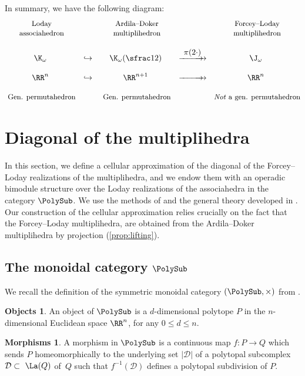 \documentclass[JEP,XML,SOM,NoFloatCountersInSection,Unicode,published]{cedram}
\def\hto{\mathrel{\lhook\joinrel\to}}
\newcommand{\onto}{\mathchoice{\to\hspace*{-5mm}\to}{\to\hspace*{-2.85mm}\to}{\to\hspace*{-3mm}\to}{\to\hspace*{-3mm}\to}}
\def\To#1{\mathchoice{\xrightarrow{\textstyle\kern4pt#1\kern3pt}}{\stackrel{#1}{\longrightarrow}}{}{}}
\def\Onto#1{\mathchoice{\To{#1}\hspace*{-5mm}\to}{\stackrel{#1}{\onto}}{}{}}
\let\dpl\displaystyle
\theoremstyle{definition}
\newtheorem*{objects}{Objects}
\newtheorem*{morphisms}{Morphisms}
\theoremstyle{plain}
\begin{document}
In summary, we have the following diagram:
\medskip
\begin{equation*}
\begin{matrix}
$ \small \text{Loday}$ & & $ \small \text{Ardila--Doker}$ & & $ \small \text{Forcey--Loday}$ \\
$ \small \text{associahedron}$ & & $ \small \text{multiplihedron}$ & & $ \small \text{multiplihedron}$ \\
& & & & \\
\K_\omega & \dpl\hto & \K_\omega (\sfrac12) & \dpl\Onto{\pi (2 \cdot)} & \J_\omega \\
& & & & \\
\RR^n & \dpl\hto & \RR^{n+1} & \dpl\Onto{\hphantom{\pi (2 \cdot)}} & \RR^n \\
& & & & \\
$ \small \text{Gen. permutahedron}$ & & $ \small \text{Gen. permutahedron}$ & & $ \small \textit{Not}\text{ a gen. permutahedron}$
\end{matrix}
\end{equation*}

\section{Diagonal of the multiplihedra}
\label{sec:II}

In this section, we define a cellular approximation of the diagonal of the Forcey--Loday realizations of the multiplihedra, and we endow them with an operadic bimodule structure over the Loday realizations of the associahedra in the category $\PolySub$.
We use the methods of \cite{MTTV19} and the general theory developed in \cite{LA21}.
Our construction of the cellular approximation relies crucially on the fact that the Forcey--Loday multiplihedra, are obtained from the Ardila--Doker multiplihedra by projection (\cref{prop:lifting}).

\subsection{The monoidal category $\PolySub$}

We recall the definition of the symmetric monoidal category $(\PolySub, \times)$ from \cite[\S 2.1]{MTTV19}.
\begin{objects}
An object of $\PolySub$ is a $d$-dimensional polytope $P$ in the $n$-dimensional Euclidean space $\RR^n$, for any $0\leq d\leq n$.
\end{objects}
\begin{morphisms}
A morphism in $\PolySub$ is a continuous map $f: P\to Q$ which sends $P$ homeomorphically to the underlying set $|\mathcal{D}|$ of a polytopal subcomplex $\mathcal{D}\subset~\La(Q)$ of~$Q$
such that $f^{-1}(\mathcal D)$ defines a polytopal subdivision of $P$.
\end{morphisms}
\end{document}

